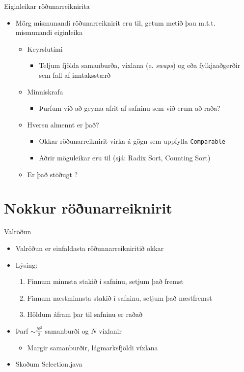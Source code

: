 \documentclass[handout]{beamer}
\begin{document}
\begin{frame}{Eiginleikar röðunarreiknirita}
\begin{itemize}
 \item Mörg mismunandi röðunarreiknirit eru til, getum metið þau m.t.t. mismunandi eiginleika
 \begin{itemize}
  \item Keyrslutími
  \begin{itemize}
   \item Teljum fjölda samanburða, víxlana (e. \emph{swaps}) og eða fylkjaaðgerðir sem fall af inntaksstærð
  \end{itemize}
  \item Minniskrafa
  \begin{itemize}
   \item Þurfum við að geyma afrit af safninu sem við erum að raða?
  \end{itemize}
  \item Hversu almennt er það?
  \begin{itemize}
   \item Okkar röðunarreiknirit virka á gögn sem uppfylla \texttt{Comparable}
   \item Aðrir möguleikar eru til (sjá: Radix Sort, Counting Sort)
  \end{itemize}
  \item Er það stöðugt ?
 \end{itemize}
\end{itemize}
\end{frame}

\section{Nokkur röðunarreiknirit}

\begin{frame}{Valröðun}
\begin{itemize}
 \item Valröðun  er einfaldasta röðunnarreikniritið okkar
 \item Lýsing:
 \begin{enumerate}
  \item Finnum minnsta stakið í safninu, setjum það fremst
  \item Finnum næstminnsta stakið í safninu, setjum það næstfremst
  \item Höldum áfram þar til safninu er raðað
 \end{enumerate}
 \item Þarf $\sim \frac{N^2}{2}$ samanburði og $N$ víxlanir
 \begin{itemize}
  \item Margir samanburðir, lágmarksfjöldi víxlana
 \end{itemize}
 \item Skoðum Selection.java 
\end{itemize}
\end{frame}
\end{document}
